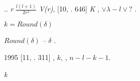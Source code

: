 \documentclass[a4paper]{article}
\begin{document}
{\CYRT}.{\cyrk}. {\cyrp}{\cyrr}{\cyri} {\cyrm}{\cyra}{\cyrl}{\cyrery}{\cyrh} \foreignlanguage{english}{\textit{r}}
{\cyrc}{\cyre}{\cyrn}{\cyrt}{\cyrr}{\cyro}{\cyrs}{\cyrt}{\cyrr}{\cyre}{\cyrm}{\cyri}{\cyrt}{\cyre}{\cyrl}{\cyrsftsn}{\cyrn}{\cyrery}{\cyrishrt}
{\cyrch}{\cyrl}{\cyre}{\cyrn}  $\frac{l(l+1)}{2r^2}$
{\cyrp}{\cyrr}{\cyre}{\cyro}{\cyrb}{\cyrl}{\cyra}{\cyrd}{\cyra}{\cyre}{\cyrt} {\cyrv}
\foreignlanguage{english}{\textit{V}}\textit{(}\foreignlanguage{english}{\textit{r}}\textit{)},
{\CYRS}{\cyra}{\cyrishrt}{\cyrm}{\cyro}{\cyrn}{\cyrs} {\cyrv}
{\cyro}{\cyrr}{\cyri}{\cyrg}{\cyri}{\cyrn}{\cyra}{\cyrl}{\cyrsftsn}{\cyrn}{\cyro}{\cyrishrt}
{\cyrs}{\cyrt}{\cyra}{\cyrt}{\cyrsftsn}{\cyre} [10, {\cyrs}{\cyrt}{\cyrr}. 646]
{\cyrp}{\cyrr}{\cyre}{\cyrd}{\cyrl}{\cyra}{\cyrg}{\cyra}{\cyre}{\cyrt}
{\cyro}{\cyrp}{\cyrr}{\cyre}{\cyrd}{\cyre}{\cyrl}{\cyri}{\cyrt}{\cyrsftsn} \foreignlanguage{english}{\textit{K}}
{\cyrt}{\cyra}{\cyrk}{\cyri}{\cyrm} {\cyro}{\cyrb}{\cyrr}{\cyra}{\cyrz}{\cyro}{\cyrm},
{\cyrch}{\cyrt}{\cyro}{\cyrb}{\cyrery}  $\vee \lambda -l\vee ?$ {\cyrb}{\cyrery}{\cyrl}
{\cyrm}{\cyri}{\cyrn}{\cyri}{\cyrm}{\cyra}{\cyrl}{\cyrsftsn}{\cyrn}{\cyrery}{\cyrm}.

{\CYRT}{\cyro}{\cyrg}{\cyrd}{\cyra} \newline
 $k=\mathit{Round}(\delta )$

 $\mathit{Round}\left(\delta \right)$\textit{ -- }{\cyrb}{\cyrl}{\cyri}{\cyrzh}{\cyra}{\cyrishrt}{\cyrsh}{\cyre}{\cyre}
{\cyrk}  $\delta $ {\cyrc}{\cyre}{\cyrl}{\cyro}{\cyre} {\cyrch}{\cyri}{\cyrs}{\cyrl}{\cyro}.

{\CYRV} {\cyrs}{\cyrt}{\cyra}{\cyrt}{\cyrsftsn}{\cyre} 1995 {\cyrg}{\cyro}{\cyrd}{\cyra} [11, {\cyrs}{\cyrt}{\cyrr}.
311] {\CYRM}{\cyra}{\cyrr}{\cyrt}{\cyri}{\cyrn}, {\cyrd}{\cyro}{\cyrv}{\cyro}{\cyrl}{\cyrsftsn}{\cyrn}{\cyro}
{\cyrp}{\cyro}{\cyrd}{\cyrr}{\cyro}{\cyrb}{\cyrn}{\cyro} {\cyro}{\cyrb}{\cyrs}{\cyru}{\cyrzh}{\cyrd}{\cyra}{\cyrya}
{\cyrp}{\cyrr}{\cyro}{\cyrb}{\cyrl}{\cyre}{\cyrm}{\cyru} {\cyrv}{\cyrery}{\cyrb}{\cyro}{\cyrr}{\cyra}  $k$,
{\cyru}{\cyrk}{\cyra}{\cyrz}{\cyrery}{\cyrv}{\cyra}{\cyre}{\cyrt} {\cyrn}{\cyra} {\cyrt}{\cyro}, {\cyrch}{\cyrt}{\cyro}
{\cyrk}{\cyro}{\cyrl}{\cyri}{\cyrch}{\cyre}{\cyrs}{\cyrt}{\cyrv}{\cyro} {\cyru}{\cyrz}{\cyrl}{\cyro}{\cyrv}
{\cyrr}{\cyra}{\cyrd}{\cyri}{\cyra}{\cyrl}{\cyrsftsn}{\cyrn}{\cyro}{\cyrishrt}
{\cyrf}{\cyru}{\cyrn}{\cyrk}{\cyrc}{\cyri}{\cyri} {\cyrr}{\cyra}{\cyrv}{\cyrn}{\cyro} \newline
 $n-l-k-1$.

{\CYRS} {\cyrm}{\cyra}{\cyrt}{\cyre}{\cyrm}{\cyra}{\cyrt}{\cyri}{\cyrch}{\cyre}{\cyrs}{\cyrk}{\cyro}{\cyrishrt}
{\cyrt}{\cyro}{\cyrch}{\cyrk}{\cyri} {\cyrz}{\cyrr}{\cyre}{\cyrn}{\cyri}{\cyrya}
{\cyrd}{\cyro}{\cyrp}{\cyru}{\cyrs}{\cyrt}{\cyri}{\cyrm}{\cyrery}
{\cyrs}{\cyrl}{\cyre}{\cyrd}{\cyru}{\cyryu}{\cyrshch}{\cyri}{\cyre}
{\cyrz}{\cyrn}{\cyra}{\cyrch}{\cyre}{\cyrn}{\cyri}{\cyrya} \foreignlanguage{english}{\textit{k}}
\end{document}
